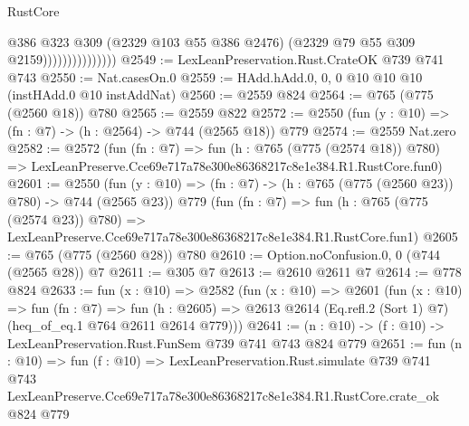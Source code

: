 \begin{lexlean}{RustCore}
\begin{coremodule}
                                @386
                                @323
                                @309
                                (@2329 @103 @55 @386 @2476)
                                (@2329 @79 @55 @309 @2159)))))))))))))))
@2549 := LexLeanPreservation.Rust.CrateOK @739 @741 @743
@2550 := Nat.casesOn.{0}
@2559 := HAdd.hAdd.{0, 0, 0} @10 @10 @10 (instHAdd.{0} @10 instAddNat)
@2560 := @2559 @824
@2564 := @765 (@775 (@2560 @18)) @780
@2565 := @2559 @822
@2572 := @2550 (fun (y : @10) => (fn : @7) -> (h : @2564) -> @744 (@2565 @18)) @779
@2574 := @2559 Nat.zero
@2582 := @2572
    (fun (fn : @7) =>
    fun (h : @765 (@775 (@2574 @18)) @780) =>
    LexLeanPreserve.Cce69e717a78e300e86368217c8e1e384.R1.RustCore.fun0)
@2601 := @2550
    (fun (y : @10) => (fn : @7) -> (h : @765 (@775 (@2560 @23)) @780) -> @744 (@2565 @23))
    @779
    (fun (fn : @7) =>
    fun (h : @765 (@775 (@2574 @23)) @780) =>
    LexLeanPreserve.Cce69e717a78e300e86368217c8e1e384.R1.RustCore.fun1)
@2605 := @765 (@775 (@2560 @28)) @780
@2610 := Option.noConfusion.{0, 0} (@744 (@2565 @28)) @7
@2611 := @305 @7
@2613 := @2610 @2611 @7
@2614 := @778 @824
@2633 := fun (x : @10) =>
  @2582
    (fun (x : @10) =>
    @2601
      (fun (x : @10) =>
      fun (fn : @7) =>
      fun (h : @2605) =>
      @2613 @2614 (Eq.refl.{2} (Sort 1) @7) (heq_of_eq.{1} @764 @2611 @2614 @779)))
@2641 := (n : @10) -> (f : @10) -> LexLeanPreservation.Rust.FunSem @739 @741 @743 @824 @779
@2651 := fun (n : @10) =>
  fun (f : @10) =>
  LexLeanPreservation.Rust.simulate
    @739
    @741
    @743
    LexLeanPreserve.Cce69e717a78e300e86368217c8e1e384.R1.RustCore.crate_ok
    @824
    @779
\end{coremodule}
\end{lexlean}
